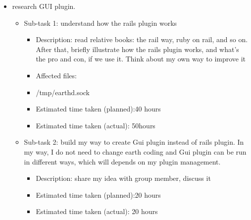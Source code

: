 \documentclass{article}
\begin{document}
 \begin{itemize}
\item research GUI plugin.
	     \begin{itemize}
	         \item Sub-task 1: understand how the rails plugin works
	            \begin{itemize}
	              \item Description: read relative books: the rail way, ruby on rail, and so on. After that, briefly illustrate how the rails plugin works, and what's the pro and con, if we use it. Think about my own way to improve it
			   	       \item Affected files:\\
                                      \item /tmp/earthd.sock\\
				      \item Estimated time taken (planned):40 hours
				      \item Estimated time taken (actual): 50hours
	                  \end{itemize}
                          \end{itemize}
               \begin{itemize}
	         \item Sub-task 2: build my way to create Gui plugin instead of rails plugin. In my way, I do not need to change earth coding and Gui plugin can be run in different ways, which will depends on my plugin management.
	            \begin{itemize}
				  \item Description: share my idea with group member, discuss it
			          \item Estimated time taken (planned):20 hours
				  \item Estimated time taken (actual): 20 hours
                   \end{itemize}
                   \end{itemize}
  \end{itemize}
\end{document}
